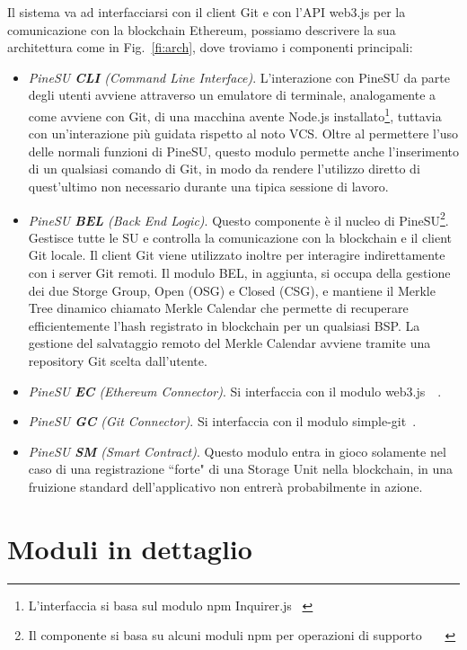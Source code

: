 Il sistema va ad interfacciarsi con il client Git e con l'API \textsf{web3.js} per la comunicazione
con la blockchain Ethereum, possiamo descrivere la sua architettura come in Fig.~\ref{fi:arch}, dove troviamo i componenti principali:
\begin{itemize}
    \item \emph{PineSU \textbf{CLI} (Command Line Interface)}. L'interazione con PineSU da parte degli utenti avviene attraverso un emulatore di terminale, analogamente a come avviene con Git, di una macchina avente Node.js installato\footnote{L'interfaccia si basa sul modulo npm Inquirer.js ~\cite{inquirer-github-21}}, tuttavia con un'interazione più guidata rispetto al noto VCS. Oltre al permettere l'uso delle normali funzioni di PineSU, questo modulo permette anche l'inserimento di un qualsiasi comando di Git, in modo da rendere l'utilizzo diretto di quest'ultimo non necessario durante una tipica sessione di lavoro.
    \item \emph{PineSU \textbf{BEL} (Back End Logic)}. Questo componente è il nucleo di PineSU\footnote{Il componente si basa su alcuni moduli npm per operazioni di supporto ~\cite{adm-zip-github-21}~\cite{chalk-github-21}~\cite{merkle-tools-github-21}}. Gestisce tutte le SU e controlla la comunicazione con la blockchain e il client Git locale.
    Il client Git viene utilizzato inoltre per interagire indirettamente con i server Git remoti.
    Il modulo BEL, in aggiunta, si occupa della gestione dei due Storge Group, Open (OSG) e Closed (CSG), e
    mantiene il Merkle Tree dinamico chiamato Merkle Calendar che permette di recuperare efficientemente
    l'hash registrato in blockchain per un qualsiasi BSP. La gestione del salvataggio remoto del Merkle Calendar avviene tramite una repository Git scelta dall'utente.
    \item \emph{PineSU \textbf{EC} (Ethereum Connector)}. Si interfaccia con il modulo \textsf{web3.js}~\cite{web3js-github-21}~\cite{web3js-doc-21}. 
    \item \emph{PineSU \textbf{GC} (Git Connector)}. Si interfaccia con il modulo \textsf{simple-git}~\cite{simple-git-github-21}. 
    \item \emph{PineSU \textbf{SM} (Smart Contract)}. Questo modulo entra in gioco solamente nel caso di una registrazione ``forte" di una Storage Unit nella blockchain, in una fruizione standard dell'applicativo non entrerà probabilmente in azione.
\end{itemize}

\section{Moduli in dettaglio}
